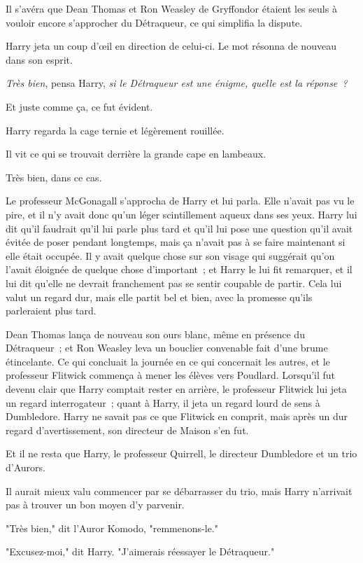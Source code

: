 Il s'avéra que Dean Thomas et Ron Weasley de Gryffondor étaient les seuls à vouloir encore s'approcher du Détraqueur, ce qui simplifia la dispute.

Harry jeta un coup d'œil en direction de celui-ci. Le mot résonna de nouveau dans son esprit.

\emph{Très bien}, pensa Harry, \emph{si le Détraqueur est une énigme, quelle est la réponse~?}

Et juste comme ça, ce fut évident.

Harry regarda la cage ternie et légèrement rouillée.

Il vit ce qui se trouvait derrière la grande cape en lambeaux.

Très bien, dans ce cas.

Le professeur McGonagall s'approcha de Harry et lui parla. Elle n'avait pas vu le pire, et il n'y avait donc qu'un léger scintillement aqueux dans ses yeux. Harry lui dit qu'il faudrait qu'il lui parle plus tard et qu'il lui pose une question qu'il avait évitée de poser pendant longtemps, mais ça n'avait pas à se faire maintenant si elle était occupée. Il y avait quelque chose sur son visage qui suggérait qu'on l'avait éloignée de quelque chose d'important~; et Harry le lui fit remarquer, et il lui dit qu'elle ne devrait franchement pas se sentir coupable de partir. Cela lui valut un regard dur, mais elle partit bel et bien, avec la promesse qu'ils parleraient plus tard.

Dean Thomas lança de nouveau son ours blanc, même en présence du Détraqueur~; et Ron Weasley leva un bouclier convenable fait d'une brume étincelante. Ce qui concluait la journée en ce qui concernait les autres, et le professeur Flitwick commença à mener les élèves vers Poudlard. Lorsqu'il fut devenu clair que Harry comptait rester en arrière, le professeur Flitwick lui jeta un regard interrogateur~; quant à Harry, il jeta un regard lourd de sens à Dumbledore. Harry ne savait pas ce que Flitwick en comprit, mais après un dur regard d'avertissement, son directeur de Maison s'en fut.

Et il ne resta que Harry, le professeur Quirrell, le directeur Dumbledore et un trio d'Aurors.

Il aurait mieux valu commencer par se débarrasser du trio, mais Harry n'arrivait pas à trouver un bon moyen d'y parvenir.

"Très bien," dit l'Auror Komodo, "remmenons-le."

"Excusez-moi," dit Harry. "J'aimerais réessayer le Détraqueur."


